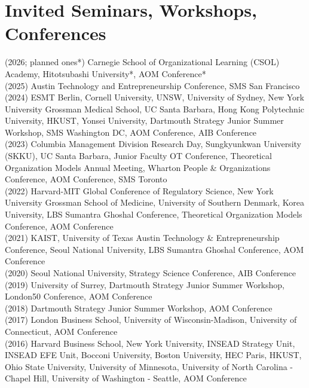 \documentclass[11pt]{article}
\begin{document}
\section{Invited Seminars, Workshops, Conferences}
\vspace{3pt}
(2026; planned ones*) Carnegie School of Organizational Learning (CSOL) Academy, Hitotsubashi University*, AOM Conference*\\[2pt]
(2025) Austin Technology and Entrepreneurship Conference, SMS San Francisco\\[2pt]
(2024) ESMT Berlin, Cornell University, UNSW, University of Sydney, New York University Grossman Medical School, UC Santa Barbara, Hong Kong Polytechnic University, HKUST, Yonsei University, Dartmouth Strategy Junior Summer Workshop, SMS Washington DC, AOM Conference, AIB Conference\\[2pt]
(2023) Columbia Management Division Research Day, Sungkyunkwan University (SKKU), UC Santa Barbara, Junior Faculty OT Conference, Theoretical Organization Models Annual Meeting, Wharton People \& Organizations Conference, AOM Conference, SMS Toronto\\[2pt]
(2022) Harvard-MIT Global Conference of Regulatory Science, New York University Grossman School of Medicine, University of Southern Denmark, Korea University, LBS Sumantra Ghoshal Conference, Theoretical Organization Models Conference, AOM Conference\\[2pt]
(2021) KAIST, University of Texas Austin Technology \& Entrepreneurship Conference, Seoul National University, LBS Sumantra Ghoshal Conference, AOM Conference\\[2pt]
(2020) Seoul National University, Strategy Science Conference, AIB Conference\\[2pt]
(2019) University of Surrey, Dartmouth Strategy Junior Summer Workshop, London50 Conference, AOM Conference\\[2pt]
(2018) Dartmouth Strategy Junior Summer Workshop, AOM Conference\\[2pt]
(2017) London Business School, University of Wisconsin-Madison, University of Connecticut, AOM Conference\\[2pt]
(2016) Harvard Business School, New York University, INSEAD Strategy Unit, INSEAD EFE Unit, Bocconi University, Boston University, HEC Paris, HKUST, Ohio State University, University of Minnesota, University of North Carolina - Chapel Hill, University of Washington - Seattle, AOM Conference
\end{document}
